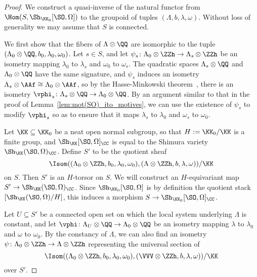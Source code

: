 \begin{proof}
We construct a quasi-inverse of the natural functor from $\Hom(S,\Sh_{\KK_0}[\SO,\Omega])$ to the groupoid of tuples $(\Lambda,b,\lambda,\omega)$. Without loss of generality we may assume that $S$ is connected.

We first show that the fibers of $\Lambda \otimes \QQ$ are isomorphic to the tuple $(\Lambda_0 \otimes \QQ,b_0,\lambda_0,\omega_0)$. Let $s \in S$, and let $\psi_s\colon \Lambda_0 \otimes \ZZh \rightarrow \Lambda_s \otimes \ZZh$ be an isometry mapping $\lambda_0$ to $\lambda_s$ and $\omega_0$ to $\omega_s$. The quadratic spaces $\Lambda_s \otimes \QQ$ and $\Lambda_0 \otimes \QQ$ have the same signature, and $\psi_s$ induces an isometry $\Lambda_s \otimes \AAf \cong \Lambda_0 \otimes \AAf$, so by the Hasse-Minkowski theorem~\cite[Chapter~IV, Theorem~9]{SerreCourse}, there is an isometry $\vphi_s\colon \Lambda_s \otimes \QQ \rightarrow \Lambda_0 \otimes \QQ$. By an argument similar to that in the proof of Lemma~\ref{lem:mot(SO)_ito_motives}, we can use the existence of $\psi_s$ to modify $\vphi_s$ so as to ensure that it maps $\lambda_s$ to $\lambda_0$ and $\omega_s$ to $\omega_0$.

Let $\KK \subseteq \KK_0$ be a neat open normal subgroup, so that $H := \KK_0/\KK$ is a finite group, and $\Sh_{\KK}[\SO,\Omega]_{\CC}$ is equal to the Shimura variety $\Sh_{\KK}(\SO,\Omega)_{\CC}$. Define $S'$ to be the quotient sheaf
$$
\Isom\!\left((\Lambda_0 \otimes \ZZh,b_0,\lambda_0,\omega_0),(\Lambda \otimes \ZZh,b,\lambda,\omega)\right)\!/\KK
$$
on $S$. Then $S'$ is an $H$-torsor on $S$. We will construct an $H$-equivariant map $S' \rightarrow \Sh_{\KK}(\SO,\Omega)_{\CC}$. Since $\Sh_{\KK_0}[\SO,\Omega]$ is by definition the quotient stack $[\Sh_{\KK}(\SO,\Omega)/H]$, this induces a morphism $S \rightarrow \Sh_{\KK_0}[\SO,\Omega]_{\CC}$.

Let $U \subseteq S'$ be a connected open set on which the local system underlying $\Lambda$ is constant, and let $\vphi\colon \Lambda_U \otimes \QQ \rightarrow \Lambda_0 \otimes \QQ$ be an isometry mapping $\lambda$ to $\lambda_0$ and $\omega$ to $\omega_0$. By the constancy of $\Lambda$, we can also find an isometry $\psi\colon \Lambda_0 \otimes \ZZh \rightarrow \Lambda \otimes \ZZh$ representing the universal section of
$$
\Isom\!\left((\Lambda_0 \otimes \ZZh,b_0,\lambda_0,\omega_0),(\VVV \otimes \ZZh,b,\lambda,\omega)\right)\!/\KK
$$
over $S'$.


\end{proof}
